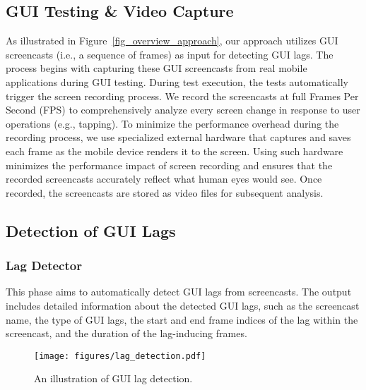 \subsection{GUI Testing \& Video Capture}
As illustrated in Figure~\ref{fig_overview_approach}, our approach utilizes GUI screencasts (i.e., a sequence of frames) as input for detecting GUI lags. The process begins with capturing these GUI screencasts from real mobile applications during GUI testing. During test execution, the tests automatically trigger the screen recording process. We record the screencasts at full Frames Per Second (FPS) to comprehensively analyze every screen change in response to user operations (e.g., tapping). To minimize the performance overhead during the recording process, we use specialized external hardware that captures and saves each frame as the mobile device renders it to the screen. Using such hardware minimizes the performance impact of screen recording and ensures that the recorded screencasts accurately reflect what human eyes would see. Once recorded, the screencasts are stored as video files for subsequent analysis. 

\subsection{Detection of GUI Lags}
\subsubsection{Lag Detector}
This phase aims to automatically detect GUI lags from screencasts. The output includes detailed information about the detected GUI lags, such as the screencast name, the type of GUI lags, the start and end frame indices of the lag within the screencast, and the duration of the lag-inducing frames. 



\begin{figure}
	\centering
    \texttt{[image: figures/lag\_detection.pdf]}
	\caption{An illustration of GUI lag detection.}
	\label{fig_lag_detection}
 \vspace{-3mm}
\end{figure}

